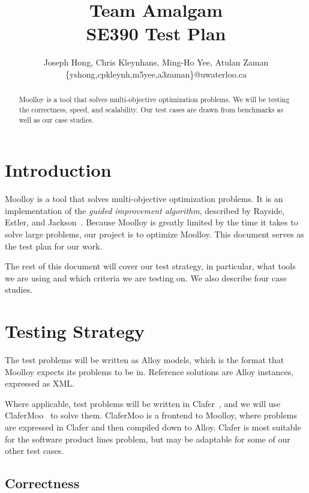 \documentclass[11pt]{article}
\title{{\Large Team Amalgam} \\ SE390 Test Plan}
\author{Joseph Hong, Chris Kleynhans, Ming-Ho Yee, Atulan Zaman \\
        \{yshong,cpkleynh,m5yee,a3zaman\}@uwaterloo.ca}
\begin{document}
\maketitle

\begin{abstract}
Moolloy is a tool that solves multi-objective optimization problems.
We will be testing the correctness, speed, and scalability. Our test
cases are drawn from benchmarks as well as our case studies.
\end{abstract}

\tableofcontents
\newpage

\section{Introduction}

Moolloy is a tool that solves multi-objective optimization problems. It
is an implementation of the \textit{guided improvement algorithm},
described by Rayside, Estler, and Jackson~\cite{ref:Rayside09}. Because
Moolloy is greatly limited by the time it takes to solve large
problems, our project is to optimize Moolloy. This document serves as
the test plan for our work.

The rest of this document will cover our test strategy, in particular,
what tools we are using and which criteria we are testing on. We also
describe four case studies.

\section{Testing Strategy}

The test problems will be written as Alloy models, which is the format
that Moolloy expects its problems to be in. Reference solutions are
Alloy instances, expressed as XML.\@

Where applicable, test problems will be written in
Clafer~\cite{ref:Bak10}, and we will use
ClaferMoo~\cite{ref:Olaechea12} to solve them. ClaferMoo is a frontend
to Moolloy, where problems are expressed in Clafer and then compiled
down to Alloy. Clafer is most suitable for the software product lines
problem, but may be adaptable for some of our other test cases.

\subsection{Correctness}
\end{document}
